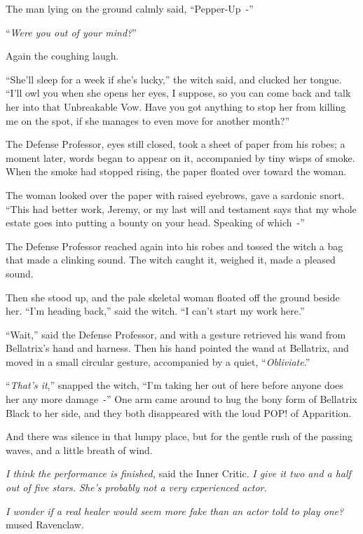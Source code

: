 The man lying on the ground calmly said, ``Pepper-Up~-''

``\emph{Were you out of your mind?}''

Again the coughing laugh.

``She'll sleep for a week if she's lucky,'' the witch said, and clucked her tongue. ``I'll owl you when she opens her eyes, I suppose, so you can come back and talk her into that Unbreakable Vow. Have you got anything to stop her from killing me on the spot, if she manages to even move for another month?''

The Defense Professor, eyes still closed, took a sheet of paper from his robes; a moment later, words began to appear on it, accompanied by tiny wisps of smoke. When the smoke had stopped rising, the paper floated over toward the woman.

The woman looked over the paper with raised eyebrows, gave a sardonic snort. ``This had better work, Jeremy, or my last will and testament says that my whole estate goes into putting a bounty on your head. Speaking of which~-''

The Defense Professor reached again into his robes and tossed the witch a bag that made a clinking sound. The witch caught it, weighed it, made a pleased sound.

Then she stood up, and the pale skeletal woman floated off the ground beside her. ``I'm heading back,'' said the witch. ``I can't start my work here.''

``Wait,'' said the Defense Professor, and with a gesture retrieved his wand from Bellatrix's hand and harness. Then his hand pointed the wand at Bellatrix, and moved in a small circular gesture, accompanied by a quiet, ``\emph{Obliviate}.''

``\emph{That's it},'' snapped the witch, ``I'm taking her out of here before anyone does her any more damage~-'' One arm came around to hug the bony form of Bellatrix Black to her side, and they both disappeared with the loud POP! of Apparition.

And there was silence in that lumpy place, but for the gentle rush of the passing waves, and a little breath of wind.

\emph{I think the performance is finished,} said the Inner Critic. \emph{I give it two and a half out of five stars. She's probably not a very experienced actor.}

\emph{I wonder if a real healer would seem more fake than an actor told to play one?} mused Ravenclaw.

